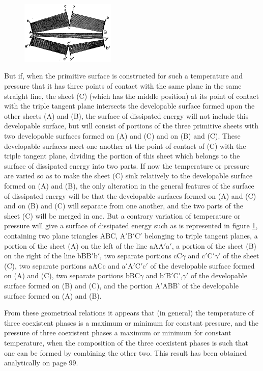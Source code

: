 \documentclass[12pt]{article}
\begin{document}
\begin{figure} %
    \centering
    \includegraphics[width=0.4\textwidth]{fig_9}
    \caption{ }
    \label{fig_9}
\end{figure}
But if, when the primitive surface is constructed for such a temperature and pressure that it has three points of contact with the same plane in the same straight line, the sheet (C) (which has the middle position) at its point of contact with the triple tangent plane intersects the developable surface formed upon the other sheets (A) and (B), the surface of dissipated energy will not include this developable surface, but will consist of portions of the three primitive sheets with two developable surfaces formed on (A) and (C) and on (B) and (C). These developable surfaces meet one another at the point of contact of (C) with the triple tangent plane, dividing the portion of this sheet which belongs to the surface of dissipated energy into two parts. If now the temperature or pressure are varied so as to make the sheet (C) sink relatively to the developable surface formed on (A) and (B), the only alteration in the general features of the surface of dissipated energy will be that the developable surfaces formed on (A) and (C) and on (B) and (C) will separate from one another, and the two parts of the sheet (C) will be merged in one. But a contrary variation of temperature or pressure will give a surface of dissipated energy such as is represented in figure \ref{fig_9}, containing two plane triangles ABC, A$'$B$'$C$'$ belonging to triple tangent planes, a portion of the sheet (A) on the left of the line aAA$'$a$'$, a portion of the sheet (B) on the right of the line bBB$'$b$'$, two separate portions cC$\gamma$ and c$'$C$'$$\gamma'$ of the sheet (C), two separate portions aACc and a$'$A$'$C$'$c$'$ of the developable surface formed on (A) and (C), two separate portions bBC$\gamma$ and b$'$B$'$C$'$,$\gamma'$ of the developable surface formed on (B) and (C), and the portion A'ABB' of the developable surface formed on (A) and (B).


From these geometrical relations it appears that (in general) the temperature of three coexistent phases is a maximum or minimum for constant pressure, and the pressure of three coexistent phases a maximum or minimum for constant temperature, when the composition of the three coexistent phases is such that one can be formed by combining the other two. This result has been obtained analytically on page 99.
\end{document}
